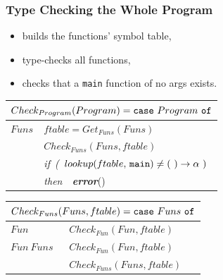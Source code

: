 \documentclass{beamer}
\newcommand{\emp}[1]{\textcolor{DikuRed}{ #1}}
\begin{document}
\begin{frame}
\frametitle{Type Checking the Whole Program}

\begin{itemize}
    \item \emp{builds the functions' symbol table,}
    \item \emp{type-checks all functions,}
    \item \emp{checks that a {\tt main} function of no args exists.}
\end{itemize}

\bigskip

\renewcommand{\arraystretch}{0.9}

\begin{tabular}{|l|l|}\hline
\multicolumn{2}{|l|}{$Check_{Program}(Program)
 = \mbox{\tt case}~Program~\mbox{\tt of} $} \\\hline
$Funs$  & $ftable = Get_{Funs}(Funs)$ \\
        & $Check_{Funs}(Funs,ftable)$\\
        & {\em if~(~$lookup(ftable,\,\mbox{\tt main}) \neq (\mbox{~})\rightarrow \alpha~)$} \\
        & {\em then~~\alert{\mbox{\bf error}}}() \\\hline
\end{tabular}

\bigskip

\begin{tabular}{|l|l|}\hline
\multicolumn{2}{|l|}{$Check_{Funs}(Funs,ftable)
 = \mbox{\tt case}~Funs~\mbox{\tt of} $} \\\hline

$Fun$   & $Check_{Fun}(Fun,ftable)$ \\\hline

$Fun~Funs$
        & $Check_{Fun}(Fun,ftable)$ \\
        & $Check_{Funs}(Funs,ftable)$ \\\hline

\end{tabular}

\end{frame}
\end{document}
